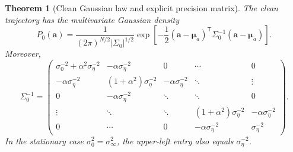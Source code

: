 \documentclass[11pt]{article}
\numberwithin{equation}{section}
\newtheorem{theorem}{Theorem}[section]
\theoremstyle{definition}
\theoremstyle{remark}
\newcommand{\trans}{\mathsf{T}}
\begin{document}
\begin{theorem}[Clean Gaussian law and explicit precision matrix]\label{thm:clean_gaussian}
The clean trajectory has the multivariate Gaussian density
\begin{equation}\label{eq:clean_gaussian}
P_0(\mathbf a)
=
\frac{1}{(2\pi)^{N/2}|\Sigma_0|^{1/2}}
\exp\!\left[-\frac12(\mathbf a-\boldsymbol{\mu}_a)^\trans\Sigma_0^{-1}(\mathbf a-\boldsymbol{\mu}_a)\right].
\end{equation}
Moreover,
\begin{equation}\label{eq:precision_matrix_general}
\Sigma_0^{-1}
=
\begin{pmatrix}
\sigma_0^{-2}+\alpha^2\sigma_\eta^{-2} & -\alpha\sigma_\eta^{-2} & 0 & \cdots & 0 \\
-\alpha\sigma_\eta^{-2} & (1+\alpha^2)\sigma_\eta^{-2} & -\alpha\sigma_\eta^{-2} & \ddots & \vdots \\
0 & -\alpha\sigma_\eta^{-2} & \ddots & \ddots & 0 \\
\vdots & \ddots & \ddots & (1+\alpha^2)\sigma_\eta^{-2} & -\alpha\sigma_\eta^{-2} \\
0 & \cdots & 0 & -\alpha\sigma_\eta^{-2} & \sigma_\eta^{-2}
\end{pmatrix}.
\end{equation}
In the stationary case $\sigma_0^2=\sigma_\infty^2$, the upper-left entry also equals $\sigma_\eta^{-2}$.
\end{theorem}
\end{document}
